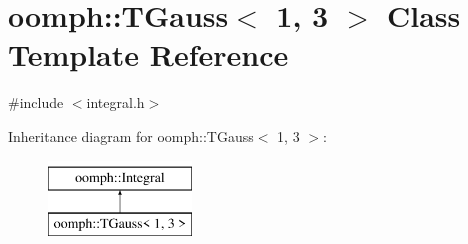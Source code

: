 \hypertarget{classoomph_1_1TGauss_3_011_00_013_01_4}{}\section{oomph\+:\+:T\+Gauss$<$ 1, 3 $>$ Class Template Reference}
\label{classoomph_1_1TGauss_3_011_00_013_01_4}


{\ttfamily \#include $<$integral.\+h$>$}

Inheritance diagram for oomph\+:\+:T\+Gauss$<$ 1, 3 $>$\+:\begin{figure}[H]
\begin{center}
\leavevmode
\includegraphics[height=2.000000cm]{classoomph_1_1TGauss_3_011_00_013_01_4}
\end{center}
\end{figure}
